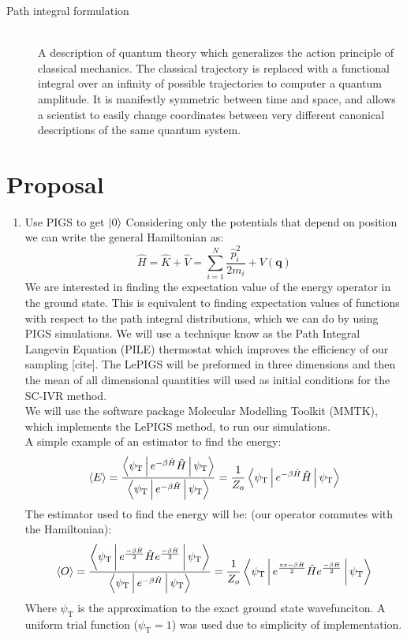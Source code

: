 \documentclass[12pt,letterpaper,oneside,final,titlepage]{article}               %
\numberwithin{equation}{section} %
\newcommand{\psiT}{\psi_{\textrm{T}}}
\renewcommand{\vec}[1]{\mathbf{#1}}
\begin{document}
\begin{description}
    \item[Path integral formulation] \hfill \\
    A description of quantum theory which generalizes the action principle of classical mechanics.
    The classical trajectory is replaced with a functional integral over an infinity of possible trajectories to computer a quantum amplitude.
    It is manifestly symmetric between time and space, and allows a scientist to easily change coordinates between very different canonical descriptions of the same quantum system.    
\end{description} 

\section{Proposal}
\begin{enumerate}
    \item Use PIGS to get $\ket{0}$
    Considering only the potentials that depend on position we can write the general Hamiltonian as:
    \begin{equation}
        \hat{H} = \hat{K} + \hat{V} = \sum_{i=1}^{N}\frac{\hat{p}_{i}^2}{2m_{i}} + V(\vec{q})
    \end{equation}
    We are interested in finding the expectation value of the energy operator in the ground state. 
    This is equivalent to finding expectation values of functions with respect to the path integral distributions, which we can do by using PIGS simulations.
    We will use a technique know as the Path Integral Langevin Equation (PILE) thermostat which improves the efficiency of our sampling [cite].
    The LePIGS will be preformed in three dimensions and then the mean of all dimensional quantities will used as initial conditions for the SC-IVR method. \\
    We will use the software package Molecular Modelling Toolkit (MMTK), which implements the LePIGS method, to run our simulations.\\
    A simple example of an estimator to find the energy:
    \begin{equation}
        \Braket{E} 
        = \frac{\Braket{\psiT|e^{-\beta\hat{H}}\hat{H}|\psiT}}{\Braket{\psiT|e^{-\beta\hat{H}}|\psiT}} 
        = \frac{1}{Z_{o}} \Braket{\psiT|e^{-\beta\hat{H}} \hat{H}|\psiT}
    \end{equation}
    The estimator used to find the energy will be: (our operator commutes with the Hamiltonian):
    \begin{equation}
        \Braket{O} 
        = \frac{\Braket{\psiT|e^{\frac{-\beta\hat{H}}{2}} \hat{H} e^{\frac{-\beta\hat{H}}{2}}|\psiT}}{\Braket{\psiT|e^{-\beta\hat{H}}|\psiT}} 
        = \frac{1}{Z_{o}} \Braket{\psiT|e^{\frac{zx-\beta\hat{H}}{2}} \hat{H} e^{\frac{-\beta\hat{H}}{2}}|\psiT}
    \end{equation}
    Where $\psiT$ is the approximation to the exact ground state wavefunciton. 
    A uniform trial function ($\psiT = 1$) was used due to simplicity of implementation.


\end{enumerate}
\end{document}
